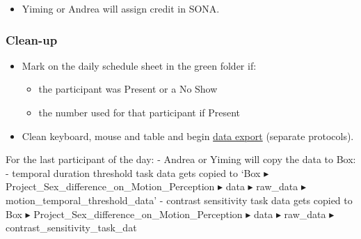 \documentclass[]{article}
\providecommand{\tightlist}{%
  \setlength{\itemsep}{0pt}\setlength{\parskip}{0pt}}
\begin{document}
\begin{itemize}
\tightlist
\item
  Yiming or Andrea will assign credit in SONA.
\end{itemize}

\hypertarget{clean-up}{%
\subsubsection{Clean-up}\label{clean-up}}

\begin{itemize}
\tightlist
\item
  Mark on the daily schedule sheet in the green folder if:

  \begin{itemize}
  \tightlist
  \item
    the participant was Present or a No Show\\
  \item
    the number used for that participant if Present
  \end{itemize}
\item
  Clean keyboard, mouse and table and begin
  \href{sex-differences-data-export.md}{data export} (separate
  protocols).
\end{itemize}

For the last participant of the day: - Andrea or Yiming will copy the
data to Box:\\
- temporal duration threshold task data gets copied to `⁨Box⁩ ▸
⁨Project\_Sex\_difference\_on\_Motion\_Perception⁩ ▸ ⁨data⁩ ▸
⁨raw\_data⁩ ▸ ⁨motion\_temporal\_threshold\_data'⁩ - contrast
sensitivity task data gets copied to Box⁩ ▸
⁨Project\_Sex\_difference\_on\_Motion\_Perception⁩ ▸ ⁨data⁩ ▸
⁨raw\_data⁩ ▸ ⁨contrast\_sensitivity\_task\_dat
\end{document}
